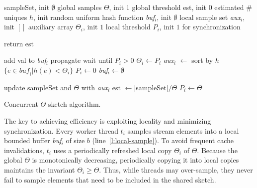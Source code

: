 \begin{algorithm*}[tb]
\small
\begin{multicols}{2}
\begin{algorithmic}[1]

\Vars
\State   sampleSet, init $\emptyset$ \Comment global samples
\State  $\Theta$, init $1$			\Comment global threshold
 est, init $0$ \Comment estimated \# uniques
\State $h$, init random uniform hash function 
\Statex
{} 
	\State \emph{buf$_i$}, init $\emptyset$ \Comment local sample set
	\State \emph{aux$_i$}, init $[ ]$ \Comment auxiliary array
	\State $\Theta_i$, init $1$ 	\Comment local threshold
	 $P_i$, init $1$ \Comment for synchronization
\EndFor
\EndFor

\Statex
{}
\State return est \label{l:query}
\EndProcedure

	add val to \emph{buf$_i$} \label{l:local-sample}
\EndIf
{} \Comment propagate
	\State wait until $P_i >0$ \label{l:wait}
	\State $\Theta_i \leftarrow P_i$ \label{l:adopt}
	\State \emph{aux$_i$}  $\leftarrow$ sort by $h$ $\{ e \in \mathit{buf_i} | h(e) <\Theta_i \}$
		\label{l:sort}
	\State $P_i \leftarrow 0$ 		\label{l:signal}
	\State \emph{buf$_i$}$ \leftarrow \emptyset$  \label{l:clean} 

\EndIf  
\EndProcedure

		\State  update sampleSet and $\Theta$ with \emph{aux$_i$} \label{l:aux}
		\State est $\leftarrow |$sampleSet$|/ \Theta$ \label{l:update-est}
		\State $P_i \leftarrow \Theta$  \label{l:theta}
\EndFor
\EndWhile
\EndProcedure

\end{algorithmic}
\end{multicols}
\caption{Concurrent $\Theta$ sketch algorithm.}
\label{alg:concurrent-theta}
\end{algorithm*}

The key to achieving efficiency is exploiting locality and minimizing synchronization.
Every worker thread $t_i$ samples stream elements into a local bounded buffer 
\emph{buf$_i$} of size $b$ (line~\ref{l:local-sample}). 
To avoid frequent cache invalidations, $t_i$ uses a periodically refreshed
local copy $\Theta_i$ of $\Theta$. 
Because the global  $\Theta$ is monotonically decreasing, periodically copying it
into local copies maintains the invariant $\Theta_i \geq \Theta$.
Thus, while threads may over-sample, they never fail to sample elements that need 
to be included in the shared sketch. 

